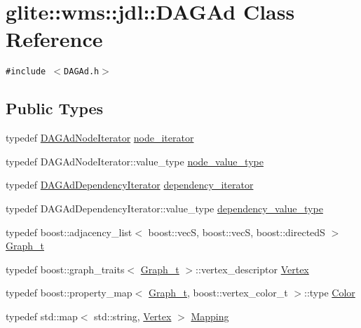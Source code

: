 \hypertarget{classglite_1_1wms_1_1jdl_1_1DAGAd}{
\section{glite::wms::jdl::DAGAd Class Reference}
\label{classglite_1_1wms_1_1jdl_1_1DAGAd}
}
{\tt \#include $<$DAGAd.h$>$}

\subsection*{Public Types}
\begin{CompactItemize}
\item 
typedef \hyperlink{classglite_1_1wms_1_1jdl_1_1DAGAdNodeIterator}{DAGAd\-Node\-Iterator} \hyperlink{classglite_1_1wms_1_1jdl_1_1DAGAd_w0}{node\_\-iterator}
\item 
typedef DAGAd\-Node\-Iterator::value\_\-type \hyperlink{classglite_1_1wms_1_1jdl_1_1DAGAd_w1}{node\_\-value\_\-type}
\item 
typedef \hyperlink{structglite_1_1wms_1_1jdl_1_1DAGAdDependencyIterator}{DAGAd\-Dependency\-Iterator} \hyperlink{classglite_1_1wms_1_1jdl_1_1DAGAd_w2}{dependency\_\-iterator}
\item 
typedef DAGAd\-Dependency\-Iterator::value\_\-type \hyperlink{classglite_1_1wms_1_1jdl_1_1DAGAd_w3}{dependency\_\-value\_\-type}
\item 
typedef boost::adjacency\_\-list$<$ boost::vec\-S, boost::vec\-S, boost::directed\-S $>$ \hyperlink{classglite_1_1wms_1_1jdl_1_1DAGAd_w4}{Graph\_\-t}
\item 
typedef boost::graph\_\-traits$<$ \hyperlink{classglite_1_1wms_1_1jdl_1_1DAGAd_w4}{Graph\_\-t} $>$::vertex\_\-descriptor \hyperlink{classglite_1_1wms_1_1jdl_1_1DAGAd_w5}{Vertex}
\item 
typedef boost::property\_\-map$<$ \hyperlink{classglite_1_1wms_1_1jdl_1_1DAGAd_w4}{Graph\_\-t}, boost::vertex\_\-color\_\-t $>$::type \hyperlink{classglite_1_1wms_1_1jdl_1_1DAGAd_w6}{Color}
\item 
typedef std::map$<$ std::string, \hyperlink{classglite_1_1wms_1_1jdl_1_1DAGAd_w5}{Vertex} $>$ \hyperlink{classglite_1_1wms_1_1jdl_1_1DAGAd_w7}{Mapping}
\end{CompactItemize}
